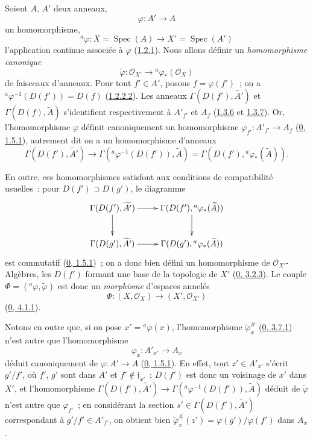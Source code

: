 \begin{env}[1.6.1]
\label{I.1.6.1-fr}
Soient $A$, $A'$ deux anneaux,
\[
  \varphi:A'\to A
\]
un homomorphisme,
\[
  {}^a\varphi:X=\operatorname{Spec}(A)\to
  X'=\operatorname{Spec}(A')
\]
l'application continue associée à $\varphi$
(\hyperref[I.1.2.1-fr]{1.2.1}). Nous allons définir un
\emph{homomorphisme canonique}
\[
  \widetilde{\varphi}:\mathscr{O}_{X'}\to
  {}^a\varphi_*(\mathscr{O}_X)
\]
de faisceaux d'anneaux. Pour tout $f'\in A'$, posons $f=\varphi(f')$~; on a
${}^a\varphi^{-1}(D(f'))=D(f)$
(\hyperref[I.1.2.2.2-fr]{1.2.2.2}). Les anneaux
$\Gamma(D(f'),\widetilde{A'})$ et $\Gamma(D(f),\widetilde{A})$
s'identifient respectivement à $A'_{f'}$ et $A_f$
(\hyperref[I.1.3.6-fr]{1.3.6} et \hyperref[I.1.3.7-fr]{1.3.7}). Or,
l'homomorphisme $\varphi$ définit canoniquement un homomorphisme
$\varphi_{f'}:A'_{f'}\to A_f$
(\hyperref[0.1.5.1-fr]{0, 1.5.1}), autrement dit on a un homomorphisme
d'anneaux
\[
  \Gamma(D(f'),\widetilde{A'})\to
  \Gamma({}^a\varphi^{-1}(D(f')),\widetilde{A})
  =\Gamma(D(f'),{}^a\varphi_*(\widetilde{A})).
\]

En outre, ces homomorphismes satisfont aux conditions de compatibilité
usuelles~: pour $D(f')\supset D(g')$, le diagramme
\[
  \xymatrix{
    \Gamma(D(f'),\widetilde{A'})\ar[r]\ar[d] &
    \Gamma(D(f'),{}^a\varphi_*(\widetilde{A}))\ar[d]\\
    \Gamma(D(g'),\widetilde{A'})\ar[r] &
    \Gamma(D(g'),{}^a\varphi_*(\widetilde{A}))
  }
\]
est commutatif (\hyperref[0.1.5.1-fr]{0, 1.5.1})~; on a donc bien défini
un homomorphisme de $\mathscr{O}_{X'}$-Algèbres, les $D(f')$ formant une
base de la topologie de $X'$ (\hyperref[0.3.2.3-fr]{0, 3.2.3}). Le couple
$\Phi=({}^a\varphi,\widetilde{\varphi})$ est donc un \emph{morphisme}
d'espaces annelés
\[
  \Phi:(X,\mathscr{O}_X)\to(X',\mathscr{O}_{X'})
\]
(\hyperref[0.4.1.1-fr]{0, 4.1.1}).

Notons en outre que, si on pose $x'={}^a\varphi(x)$, l'homomorphisme
$\widetilde{\varphi}_x^\#$ (\hyperref[0.3.7.1-fr]{0, 3.7.1}) n'est autre
que l'homomorphisme
\[
  \varphi_x:A'_{x'}\to A_x
\]
déduit canoniquement de $\varphi:A'\to A$
(\hyperref[0.1.5.1-fr]{0, 1.5.1}). En effet, tout $z'\in A'_{x'}$
s'écrit $g'/f'$, où $f'$, $g'$ sont dans $A'$ et
$f'\notin\mathfrak{j}_{x'}$~; $D(f')$ est donc un voisinage de $x'$ dans
$X'$, et l'homomorphisme
$\Gamma(D(f'),\widetilde{A'})\to
\Gamma({}^a\varphi^{-1}(D(f')),\widetilde{A})$ déduit de
$\widetilde{\varphi}$ n'est autre que $\varphi_{f'}$~; en considérant la
section $s'\in\Gamma(D(f'),\widetilde{A'})$ correspondant à
$g'/f'\in A'_{f'}$, on obtient bien
$\widetilde{\varphi}_x^\#(z')=\varphi(g')/\varphi(f')$ dans $A_x$.
\end{env}

